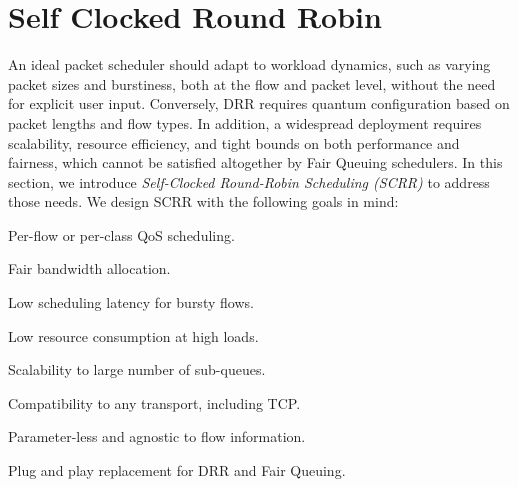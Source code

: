 

\section{Self Clocked Round Robin}
\label{sec:scrr-design}


An ideal packet scheduler should adapt to workload dynamics, such as
varying packet sizes and burstiness, both at the flow and packet
level, without the need for explicit user input. Conversely, DRR
requires quantum configuration based on packet lengths and flow
types.  In addition, a widespread deployment requires scalability,
resource efficiency, and tight bounds on both performance and
fairness, which cannot be satisfied altogether by Fair Queuing
schedulers. In this section, we introduce \textit{Self-Clocked
Round-Robin Scheduling (SCRR)} to address those needs. We design SCRR
with the following goals in mind:

\begin{compactitem}
    \item Per-flow or per-class QoS scheduling.
    \item Fair bandwidth allocation.
    \item Low scheduling latency for bursty flows.
    \item Low resource consumption at high loads.
    \item Scalability to large number of sub-queues.
    \item Compatibility to any transport, including TCP.
    \item Parameter-less and agnostic to flow information.
    \item Plug and play replacement for DRR and Fair Queuing.
\end{compactitem}


